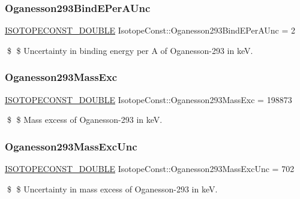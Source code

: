 \subsubsection{\texorpdfstring{Oganesson293\+Bind\+E\+Per\+A\+Unc}{Oganesson293BindEPerAUnc}}
{\footnotesize\ttfamily \mbox{\hyperlink{group___isotope_const-_macros_ga8f45a7272ce02c0b4c65c44636ed719a}{I\+S\+O\+T\+O\+P\+E\+C\+O\+N\+S\+T\+\_\+\+D\+O\+U\+B\+LE}} Isotope\+Const\+::\+Oganesson293\+Bind\+E\+Per\+A\+Unc = 2}

\$ \$ Uncertainty in binding energy per A of Oganesson-\/293 in keV. \mbox{\label{group___isotope_const-_oganesson-_og293_ga5d6feb2ff2c05270606aaf897b43aa1f}} 
\subsubsection{\texorpdfstring{Oganesson293\+Mass\+Exc}{Oganesson293MassExc}}
{\footnotesize\ttfamily \mbox{\hyperlink{group___isotope_const-_macros_ga8f45a7272ce02c0b4c65c44636ed719a}{I\+S\+O\+T\+O\+P\+E\+C\+O\+N\+S\+T\+\_\+\+D\+O\+U\+B\+LE}} Isotope\+Const\+::\+Oganesson293\+Mass\+Exc = 198873}

\$ \$ Mass excess of Oganesson-\/293 in keV. \mbox{\label{group___isotope_const-_oganesson-_og293_gae6c5edd8ff80c67547e8956a09e62927}} 
\subsubsection{\texorpdfstring{Oganesson293\+Mass\+Exc\+Unc}{Oganesson293MassExcUnc}}
{\footnotesize\ttfamily \mbox{\hyperlink{group___isotope_const-_macros_ga8f45a7272ce02c0b4c65c44636ed719a}{I\+S\+O\+T\+O\+P\+E\+C\+O\+N\+S\+T\+\_\+\+D\+O\+U\+B\+LE}} Isotope\+Const\+::\+Oganesson293\+Mass\+Exc\+Unc = 702}

\$ \$ Uncertainty in mass excess of Oganesson-\/293 in keV. \mbox{\label{group___isotope_const-_oganesson-_og293_ga6682bb751886375734ab60c8e5252a0c}} 
